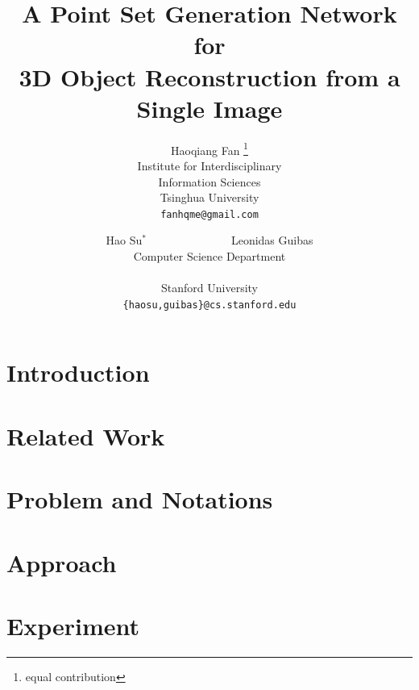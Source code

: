 \documentclass[10pt,twocolumn,letterpaper]{article}
\begin{document}
\title{A Point Set Generation Network for \\ 3D Object Reconstruction from a Single Image}

\author{Haoqiang Fan \thanks{equal contribution} \\
Institute for Interdisciplinary\\ Information Sciences\\
Tsinghua University\\
{\tt\small fanhqme@gmail.com}
\and
Hao Su${}^*$~~~~~~~~~~~~~~~Leonidas Guibas\\
Computer Science Department\\
\\
Stanford University\\
{\tt\small \{haosu,guibas\}@cs.stanford.edu}
}

\maketitle

\begin{abstract}
  
\end{abstract}

\section{Introduction}


\section{Related Work}


\section{Problem and Notations}


\section{Approach}


\section{Experiment}

\end{document}

